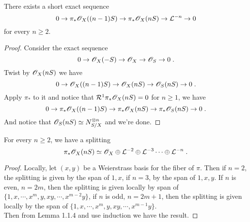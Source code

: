 \begin{lemm}
There exists a short exact sequence
$$0\rightarrow \pi_*\mathscr{O}_X((n-1)S)\rightarrow \pi_*\mathscr{O}_X(nS)\rightarrow \mathcal{L}^{-n}\rightarrow 0$$
for every $n\geq 2$.
\end{lemm}
\begin{proof}
Consider the exact sequence 
$$0\rightarrow \mathscr{O}_X(-S)\rightarrow \mathscr{O}_X\rightarrow \mathscr{O}_S\rightarrow 0\; .$$
\indent Twist by $\mathscr{O}_X(nS)$ we have
$$0\rightarrow \mathscr{O}_X((n-1)S)\rightarrow \mathscr{O}_X(nS)\rightarrow \mathscr{O}_S(nS)\rightarrow 0\; .$$
\indent Apply $\pi_*$ to it and notice that $\mathcal{R}^1\pi_*\mathscr{O}_X(nS)=0$ for $n\geq 1$, we have
$$0\rightarrow \pi_*\mathscr{O}_X((n-1)S)\rightarrow \pi_*\mathscr{O}_X(nS)\rightarrow \pi_*\mathscr{O}_S(nS)\rightarrow 0\; .$$
\indent And notice that $\mathscr{O}_S(nS)\simeq N_{S/X}^{\otimes n}$ and we're done.
\end{proof}
\begin{prop}
For every $n\geq 2$, we have a splitting
$$\pi_* \mathscr{O}_X(nS)\simeq\mathscr{O}_X\oplus \mathcal{L}^{-2}\oplus \mathcal{L}^{-3}\cdots \oplus \mathcal{L}^{-n}\; .$$
\end{prop}
\begin{proof}
Locally, let $(x,y)$ be a Weierstrass basis for the fiber of $\pi$. Then if $n=2$, the splitting is given by the span of $1,x$, if $n=3$, by the span of $1,x,y$. If $n$ is even, $n=2m$, then the splitting is given locally by span of $\{1,x,\cdots,x^m,y,xy,\cdots,x^{m-2}y\}$, if $n$ is odd, $n=2m+1$, then the splitting is given locally by the span of $\{1,x,\cdots,x^m,y,xy,\cdots,x^{m-1}y\}$.\\ \indent
Then from Lemma 1.1.4 and use induction we have the result.
\end{proof}


